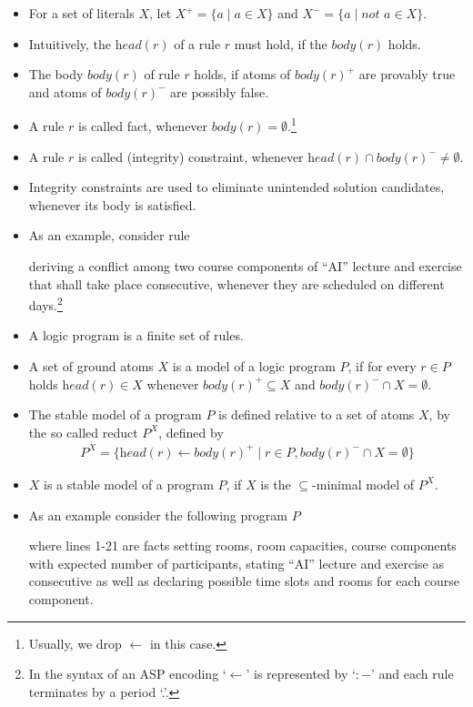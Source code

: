 \documentclass{easychair}
\newcommand{\ASP}{ASP}
\newcommand{\naf}{\textit{not }}
\newcommand{\head}{\textit{head}}
\newcommand{\body}{\textit{body}}
\begin{document}
\begin{itemize}
  \item%
  For a set of literals $X$, let $X^+ = \{a \mid a\in X \}$ and $X^- = \{a \mid \naf{} a\in X\}$. 
  \item%
  Intuitively, the $\head{(r)}$ of a rule $r$ must hold, if the $\body{(r)}$ holds. 
  \item%
  The body $\body{(r)}$ of rule $r$ holds, if atoms of $\body{(r)}^+$ are provably true and atoms of $\body{(r)}^-$ are possibly false. 
  \item%
  A rule $r$ is called fact, whenever $\body{(r)}=\emptyset$.\footnote{Usually, we drop $\leftarrow$ in this case.}  
  \item%
  A rule $r$ is called (integrity) constraint, whenever $\head{(r)}\cap\body{(r)}^-\neq\emptyset$.%
  \item%
  Integrity constraints are used to eliminate unintended solution candidates, whenever its body is satisfied. 
  \item%
  As an example, consider rule 
  
  deriving a conflict among two course components of ``AI'' lecture and exercise that shall take place consecutive, whenever they are scheduled on different days.\footnote{In the syntax of an \ASP{} encoding `$\leftarrow$' is represented by `$:-$' and each rule terminates by a period `.'.}  
  \item%
  A logic program is a finite set of rules. 
  \item%
  A set of ground atoms $X$ is a model of a logic program $P$, if for every $r\in P$ holds $\head{(r)}\in X$ whenever $\body{(r)}^+\subseteq X$ and $\body{(r)}^-\cap X=\emptyset$.
  \item%
  The stable model of a program $P$ is defined relative to a set of atoms $X$, by the so called reduct $P^X$, defined by 
  \begin{align*}
    P^X=\{\head{(r)}\leftarrow \body{(r)}^+\mid r\in P, \body{(r)}^-\cap X = \emptyset\}
  \end{align*}
  \item%
  $X$ is a stable model of a program $P$, if $X$ is the $\subseteq$-minimal model of $P^X$. 
  \item%
  As an example consider the following program $P$
  
  where lines 1-21 are facts setting rooms, room capacities, course components with expected number of participants, stating ``AI'' lecture and exercise as consecutive as well as declaring possible time slots and rooms for each course component. 

\end{itemize}
\end{document}
